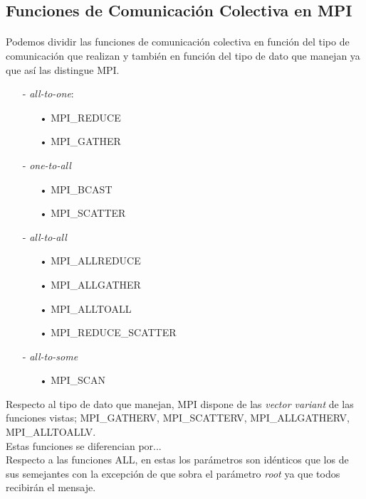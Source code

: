 \documentclass[es,gi]{ifirak}
\begin{document}
\begin{multicols}{2}
\begin{itemize}
\end{itemize} 
\subsection{Funciones de Comunicación Colectiva en MPI}
\paragraph{}
Podemos dividir las funciones de comunicación colectiva en función del tipo de comunicación que realizan y también en función del tipo de dato que manejan ya que así las distingue MPI.

\begin{itemize}
\item[-] \textit{all-to-one}:
	\begin{itemize}
		\item[•] MPI\_REDUCE
		\item[•] MPI\_GATHER
	\end{itemize}
\item[-] \textit{one-to-all}
    \begin{itemize}
		\item[•] MPI\_BCAST
		\item[•] MPI\_SCATTER
	\end{itemize}
\item[-] \textit{all-to-all}
	 \begin{itemize}
	    \item[•] MPI\_ALLREDUCE
		\item[•] MPI\_ALLGATHER
		\item[•] MPI\_ALLTOALL
		\item[•] MPI\_REDUCE\_SCATTER
	\end{itemize}
\item[-] \textit{\textit{all-to-some}}
	\begin{itemize}
		\item[•] MPI\_SCAN
	\end{itemize}
\end{itemize}

Respecto al tipo de dato que manejan, MPI dispone de las \textit{vector variant} de las funciones vistas; MPI\_GATHERV, MPI\_SCATTERV, MPI\_ALLGATHERV, MPI\_ALLTOALLV.\\

Estas funciones se diferencian por...\\

Respecto a las funciones ALL, en estas los parámetros son idénticos que los de sus semejantes con la excepción de que sobra el parámetro \textit{root} ya que todos recibirán el mensaje.


\end{multicols}
\end{document}
